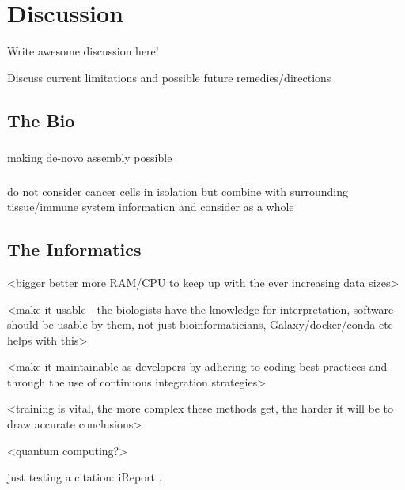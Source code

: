 \chapter{Discussion}
\label{discussion}
\setcounter{figure}{-1}
\setcounter{table}{-1}
\setcounter{section}{-1}

Write awesome discussion here!

Discuss current limitations and possible future remedies/directions

\section{The Bio}

\subsection{\color{midgrey}{Single-cell Sequencing}}

\subsection{\color{midgrey}{Ultra-long high-quality reads}}
making de-novo assembly possible

\subsection{\color{midgrey}{Environment}}
do not consider cancer cells in isolation but combine with surrounding tissue/immune system information and consider as a whole


\section{The Informatics}

<bigger better more RAM/CPU to keep up with the ever increasing data sizes>

<make it usable - the biologists have the knowledge for interpretation, software should be usable by them, not just bioinformaticians, Galaxy/docker/conda etc helps with this>

<make it maintainable as developers by adhering to coding best-practices and through the use of continuous integration strategies>

<training is vital, the more complex these methods get, the harder it will be to draw accurate conclusions>

<quantum computing?>

just testing a citation: iReport \cite{ireport}.



